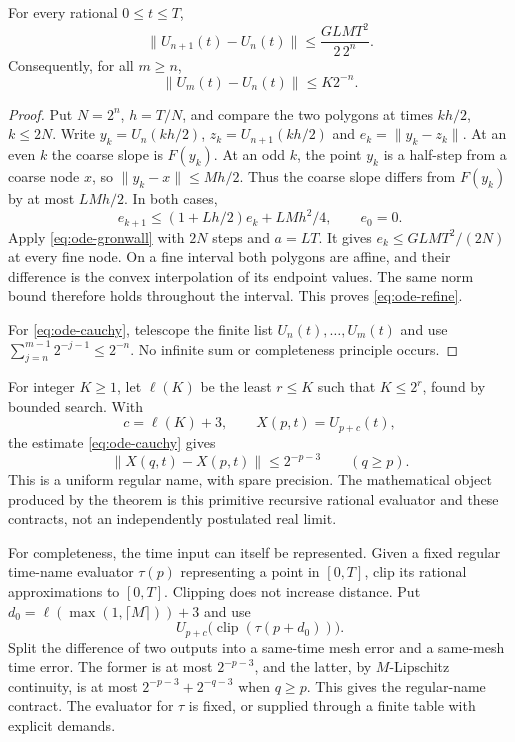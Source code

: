 \begin{theorem}
\label{thm:ode-refine}
For every rational $0\le t\le T$,
\begin{equation}
 \lVert U_{n+1}(t)-U_n(t)\rVert
       \le\frac{GLMT^2}{2\,2^n}.
 \label{eq:ode-refine}
\end{equation}
Consequently, for all $m\ge n$,
\begin{equation}
 \lVert U_m(t)-U_n(t)\rVert\le K2^{-n}.
 \label{eq:ode-cauchy}
\end{equation}
\end{theorem}
\begin{proof}
Put $N=2^n$, $h=T/N$, and compare the two polygons at times $kh/2$,
$k\le2N$.  Write $y_k=U_n(kh/2)$, $z_k=U_{n+1}(kh/2)$ and
$e_k=\lVert y_k-z_k\rVert$.  At an even $k$ the coarse slope is
$F(y_k)$.  At an odd $k$, the point $y_k$ is a half-step from a coarse
node $x$, so $\lVert y_k-x\rVert\le Mh/2$.  Thus the coarse slope
differs from $F(y_k)$ by at most $LMh/2$.  In both cases,
\[
 e_{k+1}\le(1+Lh/2)e_k+LMh^2/4,
 \qquad e_0=0.
\]
Apply \eqref{eq:ode-gronwall} with $2N$ steps and $a=LT$.  It gives
$e_k\le GLMT^2/(2N)$ at every fine node.  On a fine interval both
polygons are affine, and their difference is the convex interpolation
of its endpoint values.  The same norm bound therefore holds throughout
the interval.  This proves \eqref{eq:ode-refine}.

For \eqref{eq:ode-cauchy}, telescope the finite list
$U_n(t),\ldots,U_m(t)$ and use
$\sum_{j=n}^{m-1}2^{-j-1}\le2^{-n}$.  No infinite sum or completeness
principle occurs.
\end{proof}

For integer $K\ge1$, let $\ell(K)$ be the least $r\le K$ such that
$K\le2^r$, found by bounded search.  With
\begin{equation}
 c=\ell(K)+3,\qquad X(p,t)=U_{p+c}(t),
 \label{eq:ode-name}
\end{equation}
the estimate \eqref{eq:ode-cauchy} gives
\[
 \lVert X(q,t)-X(p,t)\rVert\le2^{-p-3}\qquad(q\ge p).
\]
This is a uniform regular name, with spare precision.  The mathematical
object produced by the theorem is this primitive recursive rational
evaluator and these contracts, not an independently postulated real limit.

For completeness, the time input can itself be represented.  Given a fixed
regular time-name evaluator $\tau(p)$ representing a point in $[0,T]$,
clip its rational approximations to $[0,T]$.  Clipping does
not increase distance.  Put
$d_0=\ell(\max(1,\lceil M\rceil))+3$ and use
\[
 U_{p+c}\bigl(\operatorname{clip}(\tau(p+d_0))\bigr).
\]
Split the difference of two outputs into a same-time mesh error and a
same-mesh time error.  The former is at most $2^{-p-3}$, and the latter,
by $M$-Lipschitz continuity, is at most $2^{-p-3}+2^{-q-3}$ when $q\ge p$.
This gives the regular-name contract.  The evaluator for $\tau$ is fixed,
or supplied through a finite table with explicit demands.


